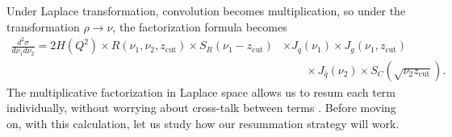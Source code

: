 \documentclass[../thesis.tex]{subfiles}
\providecommand{\zcut}{z_\mathrm{{cut}}}
\begin{document}
	Under Laplace transformation, convolution becomes multiplication, so under the transformation $\rho \to \nu$, the factorization formula becomes
	\begin{equation}\label{all-eq:factorization formula laplace}
	\begin{aligned}
		\frac{d^2\sigma}{d\nu_1 d\nu_2} = 2 H(Q^2) \times R(\nu_1, \nu_2, \zcut) \times S_R(\nu_1 - \zcut) &\times J_q(\nu_1) \times J_g(\nu_1, \zcut) \\
		&\qquad\times J_{\bar q}(\nu_2) \times S_C(\sqrt{\nu_2 \zcut}).
	\end{aligned}
	\end{equation}
	The multiplicative factorization in Laplace space allows us to resum each term individually, without worrying about cross-talk between terms \cite{frye_factorization_2016}. Before moving on, with this calculation, let us study how our resummation strategy will work.
\end{document}
